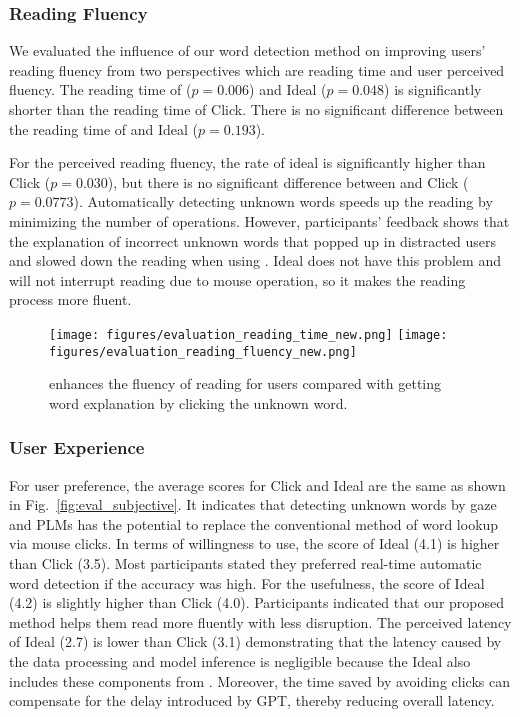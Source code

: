\subsubsection{Reading Fluency}
\label{sec:eval_reading_fluency}
We evaluated the influence of our word detection method on improving users' reading fluency from two perspectives which are reading time and user perceived fluency. The reading time of \name{} ($p = 0.006$) and Ideal ($p = 0.048$) is significantly shorter than the reading time of Click. There is no significant difference between the reading time of \name{} and Ideal ($p = 0.193$).

For the perceived reading fluency, the rate of ideal is significantly higher than Click ($p = 0.030$), but there is no significant difference between \name{} and Click ($p = 0.0773$). Automatically detecting unknown words speeds up the reading by minimizing the number of operations. However, participants' feedback shows that the explanation of incorrect unknown words that popped up in \name{} distracted users and slowed down the reading when using \name{}. Ideal does not have this problem and will not interrupt reading due to mouse operation, so it makes the reading process more fluent.

\begin{figure}[ht]
    \centering
    \texttt{[image: figures/evaluation\_reading\_time\_new.png]}
    \texttt{[image: figures/evaluation\_reading\_fluency\_new.png]}
    \caption{\name{} enhances the fluency of reading for users compared with getting word explanation by clicking the unknown word.}
    \label{fig:eval_fluency}
\end{figure}

\subsubsection{User Experience}
\label{sec:eval_user_experience}
For user preference, the average scores for Click and Ideal are the same as shown in Fig.~\ref{fig:eval_subjective}. It indicates that detecting unknown words by gaze and PLMs has the potential to replace the conventional method of word lookup via mouse clicks. In terms of willingness to use, the score of Ideal (4.1) is higher than Click (3.5). Most participants stated they preferred real-time automatic word detection if the accuracy was high. For the usefulness, the score of Ideal (4.2) is slightly higher than Click (4.0). Participants indicated that our proposed method helps them read more fluently with less disruption. The perceived latency of Ideal (2.7) is lower than Click (3.1) demonstrating that the latency caused by the data processing and model inference is negligible because the Ideal also includes these components from \name{}. Moreover, the time saved by avoiding clicks can compensate for the delay introduced by GPT, thereby reducing overall latency.

